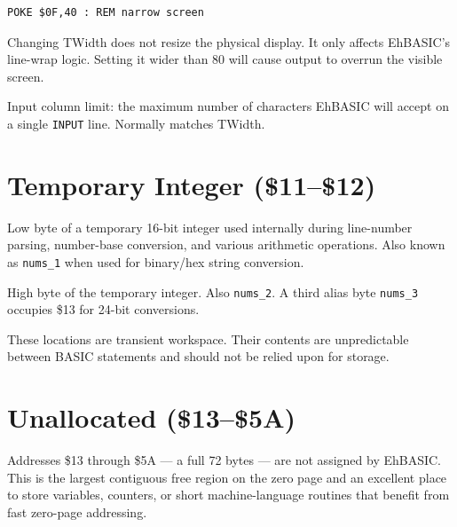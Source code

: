 \begin{lstlisting}
POKE $0F,40 : REM narrow screen
\end{lstlisting}

\begin{warningbox}
Changing TWidth does not resize the physical display.  It only affects
EhBASIC's line-wrap logic.  Setting it wider than 80 will cause output to
overrun the visible screen.
\end{warningbox}


Input column limit: the maximum number of characters EhBASIC will accept on a
single \texttt{INPUT} line.  Normally matches TWidth.

\section{Temporary Integer (\$11--\$12)}


Low byte of a temporary 16-bit integer used internally during line-number
parsing, number-base conversion, and various arithmetic operations.  Also
known as \texttt{nums\_1} when used for binary/hex string conversion.


High byte of the temporary integer.  Also \texttt{nums\_2}.  A third alias
byte \texttt{nums\_3} occupies \$13 for 24-bit conversions.

These locations are transient workspace.  Their contents are unpredictable
between BASIC statements and should not be relied upon for storage.

\section{Unallocated (\$13--\$5A)}

Addresses \$13 through \$5A --- a full 72 bytes --- are not assigned by
EhBASIC.  This is the largest contiguous free region on the zero page and an
excellent place to store variables, counters, or short machine-language
routines that benefit from fast zero-page addressing.

